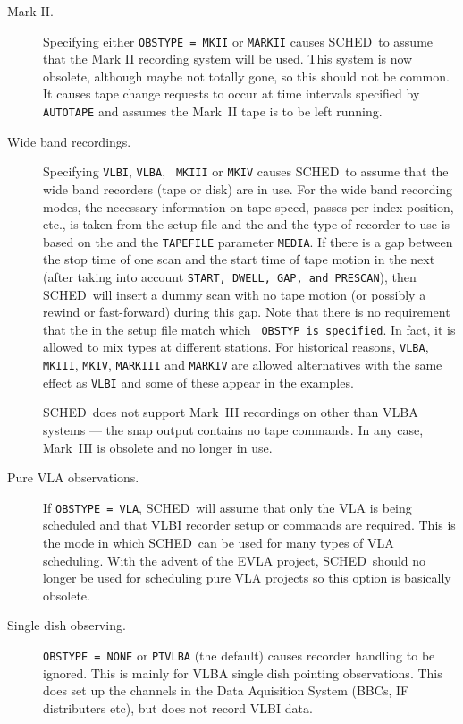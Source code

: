 \documentclass{report}
\newcommand{\schedb}{{\sc SCHED~}}
\begin{document}
\begin{description}

\item[Mark II.]  Specifying either {\tt OBSTYPE = MKII} or {\tt MARKII}
causes \schedb to assume that the Mark II recording system will be
used.  This system is now obsolete, although maybe not totally gone, so
this should not be common.  It causes tape change requests to occur
at time intervals specified by {\tt AUTOTAPE} and assumes the Mark~II
tape is to be left running.

\item[Wide band recordings.] Specifying {\tt VLBI}, {\tt VLBA}, {\tt
MKIII} or {\tt MKIV} causes \schedb to assume that the wide band
recorders (tape or disk) are in use.  For the wide band recording
modes, the necessary information on tape speed, passes per index
position, etc., is taken from the setup file and the  and the type of recorder to use is based on the
 and the {\tt TAPEFILE} parameter
{\tt MEDIA}.  If there is a gap between the stop time of one scan and
the start time of tape motion in the next (after taking into account
{\tt START, DWELL, GAP, and PRESCAN}), then \schedb will insert a
dummy scan with no tape motion (or possibly a rewind or fast-forward)
during this gap.  Note that there is no requirement that the
 in the setup file match which {\tt
OBSTYP is specified}.  In fact, it is allowed to mix types at
different stations.  For historical reasons, {\tt VLBA}, {\tt
MKIII}, {\tt MKIV}, {\tt MARKIII} and {\tt MARKIV} are allowed
alternatives with the same effect as {\tt VLBI} and some of these
appear in the examples.

\schedb does not support Mark~III recordings on other than
VLBA systems --- the snap output contains no tape commands.  In any case,
Mark~III is obsolete and no longer in use.

\item[Pure VLA observations.]  If {\tt OBSTYPE = VLA}, \schedb will
assume that only the VLA is being scheduled and that VLBI recorder setup or
commands are required.  This is the mode in which \schedb can be used
for many types of VLA scheduling.  With the advent of the EVLA project,
\schedb should no longer be used for scheduling pure VLA projects so 
this option is basically obsolete.

\item[Single dish observing.]  {\tt OBSTYPE = NONE} or {\tt PTVLBA}
(the default) causes recorder handling to be ignored. This is mainly for
VLBA single dish pointing observations.  This does set up the channels
in the Data Aquisition System (BBCs, IF distributers etc), but does
not record VLBI data.


\end{description}
\end{document}
